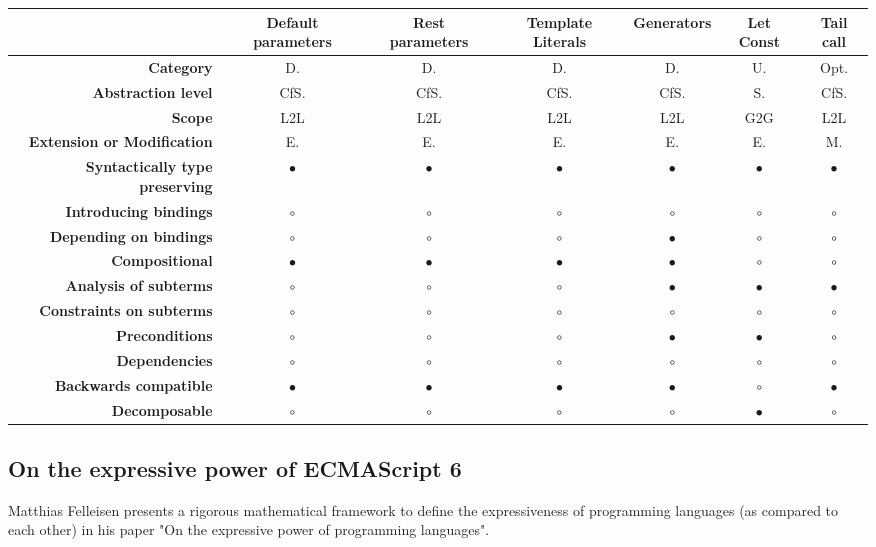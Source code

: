 {\begin{landscape}
\begin{table}[h]
\begin{tabular}{rcccccc}
\hline
& {\bf Default parameters} & {\bf Rest parameters} & {\bf Template Literals} & {\bf Generators} & {\bf Let Const} & {\bf Tail call} \\ \hline
{\bf Category} & D. & D. & D. & D. & U. & Opt. \\
{\bf Abstraction level} & CfS. & CfS. & CfS. & CfS. & S. & CfS. \\
{\bf Scope} & L2L & L2L & L2L & L2L & G2G & L2L \\
{\bf Extension or Modification} & E. & E. & E. & E. & E. & M. \\
{\bf Syntactically type preserving} & $\bullet$ & $\bullet$ & $\bullet$ & $\bullet$ & $\bullet$  & $\bullet$      \\
{\bf Introducing bindings} & $\circ$ & $\circ$ & $\circ$ & $\circ$ & $\circ$ & $\circ$ \\
{\bf Depending on bindings} & $\circ$ & $\circ$ & $\circ$ & $\bullet$ & $\circ$ & $\circ$ \\
{\bf Compositional} & $\bullet$ & $\bullet$ & $\bullet$ & $\bullet$ & $\circ$ & $\circ$ \\
{\bf Analysis of subterms} & $\circ$ & $\circ$ & $\circ$ & $\bullet$ & $\bullet$ & $\bullet$ \\
{\bf Constraints on subterms} & $\circ$ & $\circ$ & $\circ$ & $\circ$ & $\circ$ & $\circ$ \\
{\bf Preconditions} & $\circ$ & $\circ$ & $\circ$ & $\bullet$ & $\bullet$ & $\circ$ \\
{\bf Dependencies} & $\circ$ & $\circ$ & $\circ$ & $\circ$ & $\circ$ & $\circ$ \\
{\bf Backwards compatible} & $\bullet$ & $\bullet$ & $\bullet$ & $\bullet$ & $\circ$ & $\bullet$ \\
{\bf Decomposable} & $\circ$ & $\circ$ & $\circ$ & $\circ$ & $\bullet$ & $\circ$ \\ \hline
\end{tabular}
	\end{table}

		
	\end{landscape}
	\clearpage
}

\subsection{On the expressive power of ECMAScript 6}
Matthias Felleisen presents a rigorous mathematical framework to define the expressiveness of programming languages (as compared to each other) in his paper "On the expressive power of programming languages"\cite{Felleisen1990}. 

